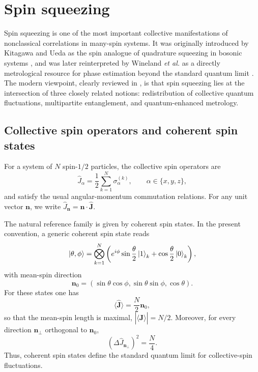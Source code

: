 \section{Spin squeezing}
\label{sec:spin_squeezing}

Spin squeezing is one of the most important collective manifestations of nonclassical correlations in many-spin systems. It was originally introduced by Kitagawa and Ueda as the spin analogue of quadrature squeezing in bosonic systems \cite{KitagawaUeda93}, and was later reinterpreted by Wineland \emph{et al.} as a directly metrological resource for phase estimation beyond the standard quantum limit \cite{Wineland94}. The modern viewpoint, clearly reviewed in \cite{Ma11}, is that spin squeezing lies at the intersection of three closely related notions: redistribution of collective quantum fluctuations, multipartite entanglement, and quantum-enhanced metrology.

\subsection{Collective spin operators and coherent spin states}

For a system of $N$ spin-$1/2$ particles, the collective spin operators are
\begin{equation}
	\hat J_\alpha=\frac{1}{2}\sum_{k=1}^{N}\sigma_\alpha^{(k)},
	\qquad
	\alpha\in\{x,y,z\},
	\label{eq:intro_qm_collective_spin_operators_ss}
\end{equation}
and satisfy the usual angular-momentum commutation relations. For any unit vector $\mathbf{n}$, we write $\hat J_{\mathbf{n}}=\mathbf{n}\cdot\hat{\mathbf{J}}$.

The natural reference family is given by coherent spin states. In the present convention, a generic coherent spin state reads
\begin{equation}
	\ket{\theta,\phi}
	=
	\bigotimes_{k=1}^{N}
	\left(
	e^{i\phi}\sin\frac{\theta}{2}\ket{1}_k
	+
	\cos\frac{\theta}{2}\ket{0}_k
	\right),
	\label{eq:intro_qm_css_definition}
\end{equation}
with mean-spin direction
\begin{equation}
	\mathbf{n}_0=(\sin\theta\cos\phi,\sin\theta\sin\phi,\cos\theta).
	\label{eq:intro_qm_css_mean_spin_direction}
\end{equation}
For these states one has
\begin{equation}
	\langle \hat{\mathbf{J}}\rangle=\frac{N}{2}\mathbf{n}_0,
	\label{eq:intro_qm_css_mean_spin}
\end{equation}
so that the mean-spin length is maximal, \( |\langle \hat{\mathbf{J}}\rangle|=N/2 \). Moreover, for every direction $\mathbf{n}_\perp$ orthogonal to $\mathbf{n}_0$,
\begin{equation}
	(\Delta \hat J_{\mathbf{n}_\perp})^2=\frac{N}{4}.
	\label{eq:intro_qm_css_transverse_variance}
\end{equation}
Thus, coherent spin states define the standard quantum limit for collective-spin fluctuations.

